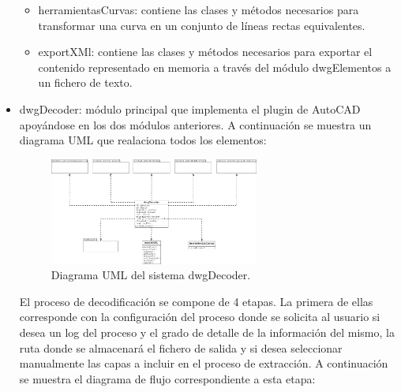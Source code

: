 \begin{itemize}
\begin{itemize}

\item{herramientasCurvas: contiene las clases y métodos necesarios para transformar una curva en un conjunto de líneas rectas equivalentes.}
\item{exportXMl: contiene las clases y métodos necesarios para exportar el contenido representado en memoria a través del módulo dwgElementos a un fichero de texto.}

\end{itemize}

\item{dwgDecoder: módulo principal que implementa el plugin de AutoCAD apoyándose en los dos módulos anteriores. A continuación se muestra un diagrama UML que realaciona todos los elementos:}

\begin{figure}[H]
\begin{center}
\includegraphics[width=0.65\textwidth]{imgs/dwgDecoder}
\caption{Diagrama UML del sistema dwgDecoder.}
\end{center}
\end{figure}

El proceso de decodificación se compone de 4 etapas. La primera de ellas corresponde con la configuración del proceso donde se solicita al usuario si desea un log del proceso y el grado de detalle de la información del mismo, la ruta donde se almacenará el fichero de salida y si desea seleccionar manualmente las capas a incluir en el proceso de extracción. A continuación se muestra el diagrama de flujo correspondiente a esta etapa:


\end{itemize}
